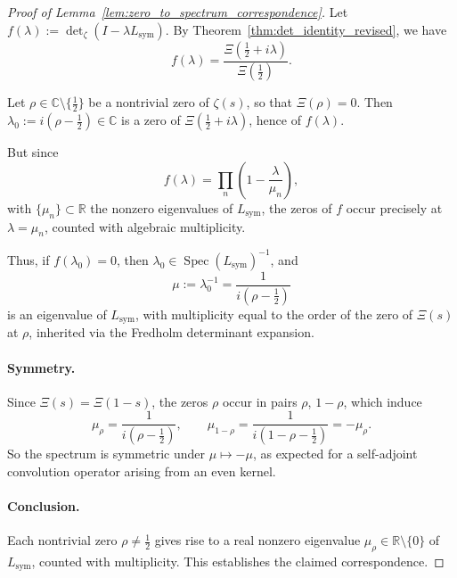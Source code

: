 \begin{proof}[Proof of Lemma~\ref{lem:zero_to_spectrum_correspondence}]
Let \( f(\lambda) := \det\nolimits_\zeta(I - \lambda L_{\mathrm{sym}}) \). By Theorem~\ref{thm:det_identity_revised}, we have
\[
f(\lambda) = \frac{\Xi\left( \tfrac{1}{2} + i\lambda \right)}{\Xi\left( \tfrac{1}{2} \right)}.
\]

Let \( \rho \in \mathbb{C} \setminus \{\tfrac{1}{2}\} \) be a nontrivial zero of \( \zeta(s) \), so that \( \Xi(\rho) = 0 \). Then \( \lambda_0 := i(\rho - \tfrac{1}{2}) \in \mathbb{C} \) is a zero of \( \Xi\left( \tfrac{1}{2} + i\lambda \right) \), hence of \( f(\lambda) \).

But since
\[
f(\lambda) = \prod_n \left( 1 - \frac{\lambda}{\mu_n} \right),
\]
with \( \{ \mu_n \} \subset \mathbb{R} \) the nonzero eigenvalues of \( L_{\mathrm{sym}} \), the zeros of \( f \) occur precisely at \( \lambda = \mu_n \), counted with algebraic multiplicity.

Thus, if \( f(\lambda_0) = 0 \), then \( \lambda_0 \in \operatorname{Spec}(L_{\mathrm{sym}})^{-1} \), and
\[
\mu := \lambda_0^{-1} = \frac{1}{i(\rho - \tfrac{1}{2})}
\]
is an eigenvalue of \( L_{\mathrm{sym}} \), with multiplicity equal to the order of the zero of \( \Xi(s) \) at \( \rho \), inherited via the Fredholm determinant expansion.

\paragraph{Symmetry.}
Since \( \Xi(s) = \Xi(1 - s) \), the zeros \( \rho \) occur in pairs \( \rho \), \( 1 - \rho \), which induce
\[
\mu_\rho = \frac{1}{i(\rho - \tfrac{1}{2})}, \qquad \mu_{1 - \rho} = \frac{1}{i(1 - \rho - \tfrac{1}{2})} = -\mu_\rho.
\]
So the spectrum is symmetric under \( \mu \mapsto -\mu \), as expected for a self-adjoint convolution operator arising from an even kernel.

\paragraph{Conclusion.}
Each nontrivial zero \( \rho \ne \tfrac{1}{2} \) gives rise to a real nonzero eigenvalue \( \mu_\rho \in \mathbb{R} \setminus \{0\} \) of \( L_{\mathrm{sym}} \), counted with multiplicity. This establishes the claimed correspondence.
\end{proof}
% 